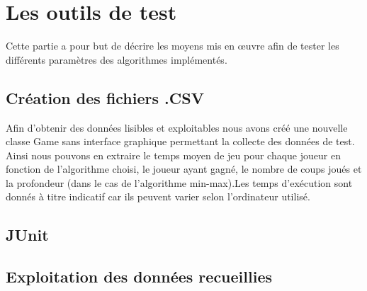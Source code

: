 \documentclass{report}
\begin{document}
	\chapter{Les outils de test}
	Cette partie a pour but de décrire les moyens mis en œuvre afin de tester les différents paramètres des algorithmes implémentés. 
	\section{Création des fichiers .CSV}
	\label{fichierCSV}
	Afin d'obtenir des données lisibles et exploitables nous avons créé une nouvelle classe Game sans interface graphique permettant la collecte des données de test.
	Ainsi nous pouvons en extraire le temps moyen de jeu pour chaque joueur en fonction de l'algorithme choisi, le joueur ayant gagné,
	le nombre de coups joués et la profondeur (dans le cas de l'algorithme min-max).Les temps d'exécution sont donnés à titre indicatif car ils peuvent varier selon l'ordinateur utilisé.
	\section{JUnit}
	
	\section{Exploitation des données recueillies}
	
\end{document}
